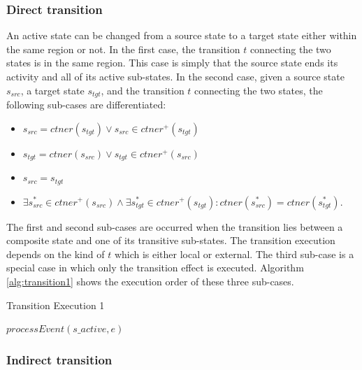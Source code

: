 \subsubsection{Direct transition}
An active state can be changed from a source state to a target state either within the same region or not. In the first case, the transition $t$ connecting the two states is in the same region. This case is simply that the source state ends its activity and all of its active sub-states. In the second case, given a source state $s_{src}$, a target state $s_{tgt}$, and the transition $t$ connecting the two states, the following sub-cases are differentiated:
\begin{itemize}
	\item $s_{src} = ctner(s_{tgt}) \vee s_{src} \in ctner^+(s_{tgt})$
	
	\item $s_{tgt} = ctner(s_{src}) \vee s_{tgt} \in ctner^+(s_{src})$
	
	\item $s_{src} = s_{tgt}$
	
	
	
	\item $\exists s_{src}^* \in ctner^+(s_{src}) \wedge \exists s_{tgt}^* \in ctner^+(s_{tgt}): ctner(s_{src}^*) = ctner(s_{tgt}^*)$.
\end{itemize}  

The first and second sub-cases are occurred when the transition lies between a composite state and one of its transitive sub-states. The transition execution depends on the kind of $t$ which is either local or external. The third sub-case is a special case in which only the transition effect is executed. Algorithm \ref{alg:transition1} shows the execution order of these three sub-cases. 

\begin{algorithm}[]
	\caption{Transition Execution 1
		\label{alg:transition1}}
	\begin{algorithmic}[1]
		\EndFor	 			 
		\EndIf
		\State $processEvent(s\_active, e)$
		\EndIf
		\EndIf
		\EndProcedure	
	\end{algorithmic}
\end{algorithm}

\subsubsection{Indirect transition}